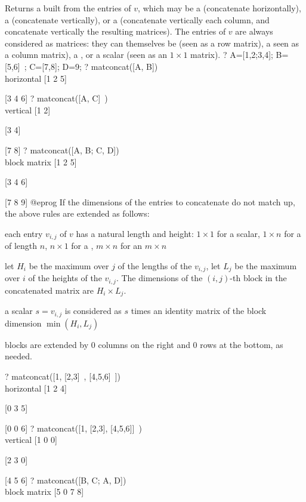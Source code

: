 \label{se:matconcat}
Returns a  built from the entries of $v$, which may
be a  (concatenate horizontally), a  (concatenate
vertically), or a  (concatenate vertically each column, and
concatenate vertically the resulting matrices). The entries of $v$ are always
considered as matrices: they can themselves be  (seen as a row
matrix), a  seen as a column matrix), a , or a scalar (seen
as an $1 \times 1$ matrix).
\bprog
? A=[1,2;3,4]; B=[5,6]~; C=[7,8]; D=9;
? matconcat([A, B]) \\ horizontal
[1 2 5]

[3 4 6]
? matconcat([A, C]~) \\ vertical
[1 2]

[3 4]

[7 8]
? matconcat([A, B; C, D]) \\ block matrix
[1 2 5]

[3 4 6]

[7 8 9]
@eprog\noindent
If the dimensions of the entries to concatenate do not match up, the above
rules are extended as follows:

\item each entry $v_{i,j}$ of $v$ has a natural length and height: $1 \times
1$ for a scalar, $1 \times n$ for a  of length $n$, $n \times 1$
for a , $m \times n$ for an $m\times n$ 

\item let $H_i$ be the maximum over $j$ of the lengths of the $v_{i,j}$,
let $L_j$ be the maximum over $i$ of the heights of the $v_{i,j}$.
The dimensions of the $(i,j)$-th block in the concatenated matrix are
$H_i \times L_j$.

\item a scalar $s = v_{i,j}$ is considered as $s$ times an identity matrix
of the block dimension $\min (H_i,L_j)$

\item blocks are extended by 0 columns on the right and 0 rows at the
bottom, as needed.

\bprog
? matconcat([1, [2,3]~, [4,5,6]~]) \\ horizontal
[1 2 4]

[0 3 5]

[0 0 6]
? matconcat([1, [2,3], [4,5,6]]~) \\ vertical
[1 0 0]

[2 3 0]

[4 5 6]
? matconcat([B, C; A, D]) \\ block matrix
[5 0 7 8]


